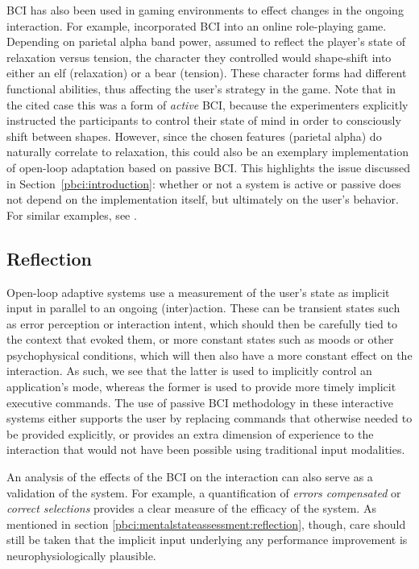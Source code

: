 BCI has also been used in gaming environments to effect changes in the ongoing interaction. For example,  incorporated BCI into an online role-playing game. Depending on parietal alpha band power, assumed to reflect the player's state of relaxation versus tension, the character they controlled would shape-shift into either an elf (relaxation) or a bear (tension). These character forms had different functional abilities, thus affecting the user's strategy in the game. Note that in the cited case this was a form of \emph{active} BCI, because the experimenters explicitly instructed the participants to control their state of mind in order to consciously shift between shapes. However, since the chosen features (parietal alpha) do naturally correlate to relaxation, this could also be an exemplary implementation of open-loop adaptation based on passive BCI. This highlights the issue discussed in Section~\ref{pbci:introduction}: whether or not a system is active or passive does not depend on the implementation itself, but ultimately on the user's behavior. For similar examples, see .


\subsection{Reflection}

Open-loop adaptive systems use a measurement of the user's state as implicit input in parallel to an ongoing (inter)action. These can be transient states such as error perception or interaction intent, which should then be carefully tied to the context that evoked them, or more constant states such as moods or other psychophysical conditions, which will then also have a more constant effect on the interaction. As such, we see that the latter is used to implicitly control an application's mode, whereas the former is used to provide more timely implicit executive commands. The use of passive BCI methodology in these interactive systems either supports the user by replacing commands that otherwise needed to be provided explicitly, or provides an extra dimension of experience to the interaction that would not have been possible using traditional input modalities.

An analysis of the effects of the BCI on the interaction can also serve as a validation of the system. For example, a quantification of \emph{errors compensated} or \emph{correct selections} provides a clear measure of the efficacy of the system. As mentioned in section \ref{pbci:mentalstateassessment:reflection}, though, care should still be taken that the implicit input underlying any performance improvement is neurophysiologically plausible. 

